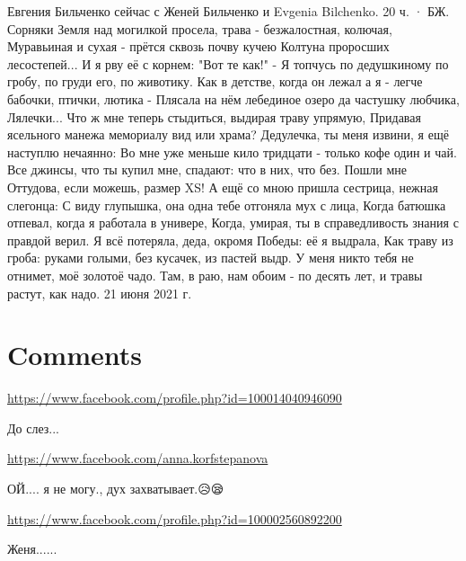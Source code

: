 \documentclass[a4paper,11pt]{extreport}
\begin{document}
Евгения Бильченко сейчас с Женей Бильченко и Evgenia Bilchenko.
20 ч. ·
БЖ. Сорняки
Земля над могилкой просела, трава - безжалостная, колючая,
Муравьиная и сухая - прётся сквозь почву кучею
Колтуна проросших лесостепей... И я рву её с корнем: "Вот те как!" -
Я топчусь по дедушкиному по гробу, по груди его, по животику.
Как в детстве, когда он лежал а я - легче бабочки, птички, лютика -
Плясала на нём лебединое озеро да частушку любчика,
Лялечки... Что ж мне теперь стыдиться, выдирая траву упрямую,
Придавая ясельного манежа мемориалу вид или храма?
Дедулечка, ты меня извини, я ещё наступлю нечаянно:
Во мне уже меньше кило тридцати - только кофе один и чай.
Все джинсы, что ты купил мне, спадают: что в них, что без.
Пошли мне Оттудова, если можешь, размер XS!
А ещё со мною пришла сестрица, нежная слегонца:
С виду глупышка, она одна тебе отгоняла мух с лица,
Когда батюшка отпевал, когда я работала в универе,
Когда, умирая, ты в справедливость знания с правдой верил.
Я всё потеряла, деда, окромя Победы: её я выдрала,
Как траву из гроба: руками голыми, без кусачек, из пастей выдр.
У меня никто тебя не отнимет, моё золотоё чадо.
Там, в раю, нам обоим - по десять лет, и травы растут, как надо.
21 июня 2021 г.
\section{Comments}
\begin{itemize}
\url{https://www.facebook.com/profile.php?id=100014040946090}

До слез...

\url{https://www.facebook.com/anna.korfstepanova}

ОЙ.... я не могу., дух захватывает.😥😪

\url{https://www.facebook.com/profile.php?id=100002560892200}

Женя......

\end{itemize}
\end{document}
